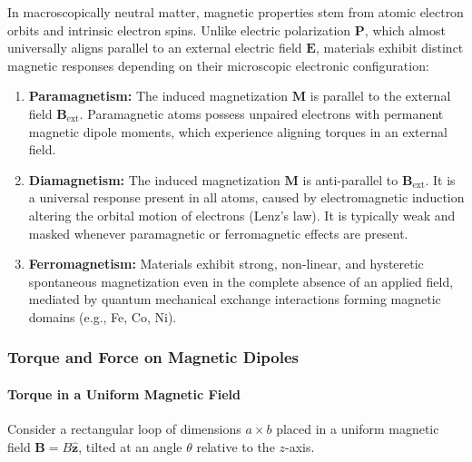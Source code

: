 In macroscopically neutral matter, magnetic properties stem from atomic electron orbits and intrinsic electron spins. Unlike electric polarization $\bm{P}$, which almost universally aligns parallel to an external electric field $\bm{E}$, materials exhibit distinct magnetic responses depending on their microscopic electronic configuration:

\begin{enumerate}
    \item \textbf{Paramagnetism:} The induced magnetization $\bm{M}$ is parallel to the external field $\bm{B}_{\text{ext}}$. Paramagnetic atoms possess unpaired electrons with permanent magnetic dipole moments, which experience aligning torques in an external field.
    \item \textbf{Diamagnetism:} The induced magnetization $\bm{M}$ is anti-parallel to $\bm{B}_{\text{ext}}$. It is a universal response present in all atoms, caused by electromagnetic induction altering the orbital motion of electrons (Lenz's law). It is typically weak and masked whenever paramagnetic or ferromagnetic effects are present.
    \item \textbf{Ferromagnetism:} Materials exhibit strong, non-linear, and hysteretic spontaneous magnetization even in the complete absence of an applied field, mediated by quantum mechanical exchange interactions forming magnetic domains (e.g., Fe, Co, Ni).
\end{enumerate}

\subsubsection{Torque and Force on Magnetic Dipoles}

\paragraph{Torque in a Uniform Magnetic Field}

Consider a rectangular loop of dimensions $a \times b$ placed in a uniform magnetic field $\bm{B} = B \hat{\bm{z}}$, tilted at an angle $\theta$ relative to the $z$-axis.

